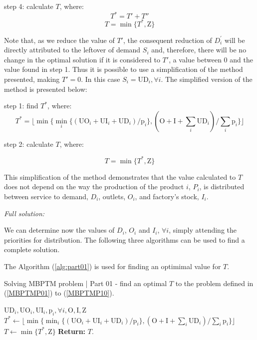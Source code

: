 \documentclass[10pt,fleqn,a4paper,twoside]{article}
\begin{document}
step 4: calculate $T$, where: 
\begin{equation}
T^* = T' + T''
\end{equation}
\begin{equation}
T = \min \{T^* , \textrm{Z}\}
\end{equation}

Note that, as we reduce the value of $T'$, the consequent reduction of $D_{i}^{'}$ will be directly attributed to the leftover of demand $S_i$ and, therefore, there will be no change in the optimal solution if it is considered to $T'$, a value between 0 and the value found in step 1. Thus it is possible to use a simplification of the method presented, making $T' = 0$. In this case $S_i = \textrm{UD}_i, \forall i$. The simplified version of the method is presented below:

step 1: find $T^*$, where:
\begin{equation}
T^* = \lfloor{\min \{\min_{i} \{(\textrm{UO}_i + \textrm{UI}_i + \textrm{UD}_i) / \textrm{p}_i\},(\textrm{O} + \textrm{I} + \sum_i \textrm{UD}_i) / \sum_i {\textrm{p}_i}\}}\rfloor
\end{equation}

step 2: calculate $T$, where: 

\begin{equation}
T = \min \{T^* , \textrm{Z}\}
\end{equation}

This simplification of the method demonstrates that the value calculated to $T$ does not depend on the way the production of the product $i$, $P_i$, is distributed between service to demand, $D_i$, outlets, $O_i$, and  factory's stock, $I_i$.

\noindent \emph{Full solution:} 

We can determine now the values of $D_i$, $O_i$ and $I_i$, $\forall i$, simply attending the priorities for distribution. The following three algorithms can be used to find a complete solution.

The Algorithm (\ref{alg:part01}) is used for finding an optimimal value for $T$.

\begin{algorithm}
\caption{Solving MBPTM problem | Part 01 - find an optimal $T$ to the problem defined in (\ref{MBPTMP01}) to (\ref{MBPTMP10}).}\label{alg:part01}
\begin{algorithmic}
	\Require $\textrm{UD}_i, \textrm{UO}_i, \textrm{UI}_i, \textrm{p}_i, \forall i, \textrm{O}, \textrm{I}, \textrm{Z}$
	\State $T^* \gets \lfloor{\min \{\min_{i} \{(\textrm{UO}_i + \textrm{UI}_i + \textrm{UD}_i) / \textrm{p}_i\},(\textrm{O} + \textrm{I} + \sum_i \textrm{UD}_i) / \sum_i {\textrm{p}_i}\}}\rfloor$
	\State $T \gets \min \{T^* , \textrm{Z}\}$
\State \textbf{Return:} $T$.
\end{algorithmic}
\end{algorithm}
\end{document}
